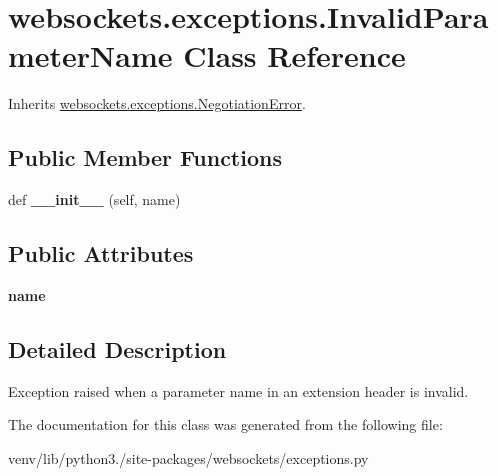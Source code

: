 \hypertarget{classwebsockets_1_1exceptions_1_1_invalid_parameter_name}{}\section{websockets.\+exceptions.\+Invalid\+Parameter\+Name Class Reference}
\label{classwebsockets_1_1exceptions_1_1_invalid_parameter_name}


Inherits \hyperlink{classwebsockets_1_1exceptions_1_1_negotiation_error}{websockets.\+exceptions.\+Negotiation\+Error}.

\subsection*{Public Member Functions}
\begin{DoxyCompactItemize}
\item 
\mbox{\label{classwebsockets_1_1exceptions_1_1_invalid_parameter_name_a36ec400d9dab3b083e771313ea962010}} 
def {\bfseries \+\_\+\+\_\+init\+\_\+\+\_\+} (self, name)
\end{DoxyCompactItemize}
\subsection*{Public Attributes}
\begin{DoxyCompactItemize}
\item 
\mbox{\label{classwebsockets_1_1exceptions_1_1_invalid_parameter_name_adc4ab971340db4cdd2c6c5fe916c878d}} 
{\bfseries name}
\end{DoxyCompactItemize}


\subsection{Detailed Description}
\begin{DoxyVerb}Exception raised when a parameter name in an extension header is invalid.\end{DoxyVerb}
 

The documentation for this class was generated from the following file\+:\begin{DoxyCompactItemize}
\item 
venv/lib/python3./site-\/packages/websockets/exceptions.\+py\end{DoxyCompactItemize}
